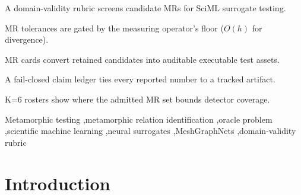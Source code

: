 \documentclass[preprint,12pt]{elsarticle}
\begin{document}
\begin{frontmatter}
\begin{abstract}
\textbf{Results:}
The gate is shown to change V\&V outcomes, not merely annotate them: it removes detectors that would raise false alarms on a correct surrogate, and on a second CFD task it rejects, on physical grounds, a continuity relation it only defers on cylinder flow. On cylinder flow the typed verdicts recur unchanged across a same-family roster and a PhysicsNeMo replication (node permutation exact, mirror-y bounded out-of-distribution stress, absolute conservation deferred against a closed-form floor); on PINN and FNO surrogates the gate gives each task's relation-appropriate verdict. Seeded-fault tests bound detector coverage, not as a general fault-detection rate.

\textbf{Conclusion:}
Validity-gated MR assets make oracle-free SciML V\&V more auditable by recording why a relation is admitted, rejected, deferred, or interpreted as out-of-relation-domain. The study supports a reusable workflow for converting physics-derived relations into executable assets with typed verdicts. Broader generalization is future work.
\end{abstract}

\begin{highlights}
\item A domain-validity rubric screens candidate MRs for SciML surrogate testing.
\item MR tolerances are gated by the measuring operator's floor ($O(h)$ for divergence).
\item MR cards convert retained candidates into auditable executable test assets.
\item A fail-closed claim ledger ties every reported number to a tracked artifact.
\item K=6 rosters show where the admitted MR set bounds detector coverage.
\end{highlights}

\begin{keyword}
Metamorphic testing \sep metamorphic relation identification \sep oracle problem \sep scientific machine learning \sep neural surrogates \sep MeshGraphNets \sep domain-validity rubric
\end{keyword}

\end{frontmatter}

\section{Introduction}
\label{sec:introduction}
\end{document}
